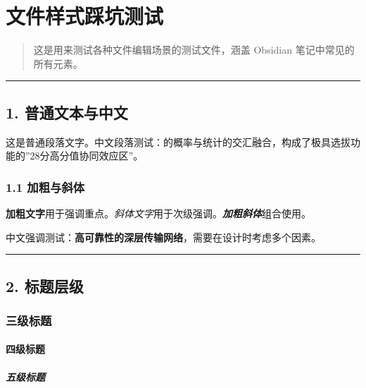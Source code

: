 \documentclass[]{article}
\begin{document}
\section{文件样式踩坑测试}\label{ux6587ux4ef6ux6837ux5f0fux8e29ux5751ux6d4bux8bd5}

\begin{quote}
这是用来测试各种文件编辑场景的测试文件，涵盖 Obsidian
笔记中常见的所有元素。
\end{quote}

\begin{center}\rule{0.5\linewidth}{0.5pt}\end{center}

\subsection{1.
普通文本与中文}\label{ux666eux901aux6587ux672cux4e0eux4e2dux6587}

这是普通段落文字。中文段落测试：的概率与统计的交汇融合，构成了极具选拔功能的''28分高分值协同效应区''。

\subsubsection{1.1 加粗与斜体}\label{ux52a0ux7c97ux4e0eux659cux4f53}

\textbf{加粗文字}用于强调重点。\emph{斜体文字}用于次级强调。\textbf{\emph{加粗斜体}}组合使用。

中文强调测试：\textbf{高可靠性的深层传输网络}，需要在设计时考虑多个因素。

\begin{center}\rule{0.5\linewidth}{0.5pt}\end{center}

\subsection{2. 标题层级}\label{ux6807ux9898ux5c42ux7ea7}

\subsubsection{三级标题}\label{ux4e09ux7ea7ux6807ux9898}

\paragraph{四级标题}\label{ux56dbux7ea7ux6807ux9898}

\subparagraph{五级标题}\label{ux4e94ux7ea7ux6807ux9898}
\end{document}

